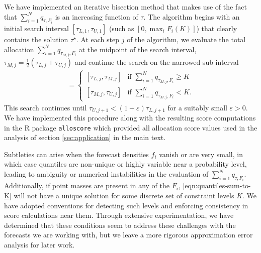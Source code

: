 \documentclass{article}
\begin{document}
We have implemented an iterative bisection method that makes use of the fact that $\sum_{i=1}^N q_{\tau,F_i}$
is an increasing function of $\tau$.
The algorithm begins with an initial search interval $[\tau_{L,1}, \tau_{U,1}]$ (such as $[0,\max_{i}F_i(K)]$) that clearly contains
the solution $\tau^{\star}$.
At each step $j$ of the algorithm, we evaluate the total allocation $\sum_{i=1}^N q_{\tau_{M,j},F_i}$ at the midpoint of the search interval,
$\tau_{M,j} = \frac{1}{2}(\tau_{L,j} + \tau_{U,j})$ and continue the search on the narrowed sub-interval
\begin{align}
[\tau_{L,j+1},\tau_{U,j+1}] =
\begin{cases}
[\tau_{L,j}, \tau_{M,j}] & \text{if } \sum_{i=1}^N q_{\tau_{M,j},F_i} \geq K \\
[\tau_{M,j}, \tau_{U,j}] & \text{if } \sum_{i=1}^N q_{\tau_{M,j},F_i} < K.
\end{cases} \nonumber
\end{align}
This search continues until $\tau_{U,j+1} < (1+\varepsilon)\tau_{L,j+1}$ for a suitably small $\varepsilon>0$.
We have implemented this procedure along with the resulting score computations in the
R package \verb`alloscore` which provided all allocation score values used in the analysis of section \ref{sec:application}
in the main text.

Subtleties can arise when the forecast
densities $f_i$ vanish or are very small, in which case quantiles are non-unique or highly variable near a probability level,
leading to ambiguity or numerical instabilities in the evaluation of $\sum_{i=1}^N q_{\tau,F_i}$. Additionally, if point masses are present in any of the $F_i$,
\eqref{eqn:quantiles-sum-to-K} will not have a unique solution for some discrete set of constraint levels $K$.
We have adopted conventions for detecting such levels and enforcing consistency in score calculations
near them. Through extensive experimentation, we have determined that these conditions seem to address these challenges with the forecasts we are working with, but we leave a more rigorous approximation error analysis for later work.
\end{document}
